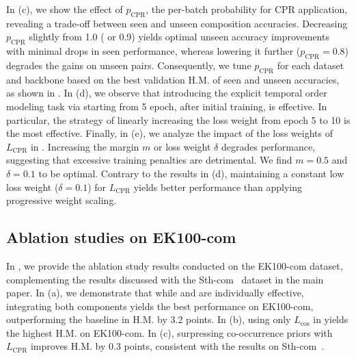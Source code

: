 




In  (c), we show the effect of $p_\text{CPR}$, the per-batch probability for CPR application, revealing a trade-off between seen and unseen composition accuracies. 
Decreasing $p_\text{CPR}$ slightly from 1.0 ( or 0.9) yields optimal unseen accuracy improvements with minimal drops in seen performance, whereas lowering it further (\eg $p_\text{CPR} = 0.8$) degrades the gains on unseen pairs. 
Consequently, we tune $p_\text{CPR}$ for each dataset and backbone based on the best validation H.M. of seen and unseen accuracies, as shown in .
In  (d), we observe that introducing the explicit temporal order modeling task via \torc{} starting from 5 epoch, after initial training, is effective.
In particular, the strategy of linearly increasing the loss weight from epoch 5 to 10 is the most effective. %
Finally, in  (e), we analyze the impact of the loss weights of $L_\text{CPR}$ in \cpr{}. Increasing the margin $m$ or loss weight $\delta$ degrades performance, suggesting that excessive training penalties are detrimental. 
We find $m=0.5$ and $\delta=0.1$ to be optimal. Contrary to the results in  (d), maintaining a constant low loss weight ($\delta=0.1$) for $L_\text{CPR}$ yields better performance than applying progressive weight scaling.


\subsection{Ablation studies on EK100-com}
In , we provide the ablation study results conducted on the EK100-com dataset, complementing the results discussed with the Sth-com~\cite{li2024c2c} dataset in the main paper. 
In  (a), we demonstrate that while \cpr{} and \torc{} are individually effective, integrating both components yields the best performance on EK100-com, outperforming the baseline in H.M. by 3.2 points.
In  (b), using only $L_\text{cos}$ in \torc{} yields the highest H.M. on EK100-com.
In  (c), surpressing co-occurrence priors with $L_\text{CPR}$ improves H.M. by 0.3 points, consistent with the results on Sth-com~\cite{li2024c2c}.







